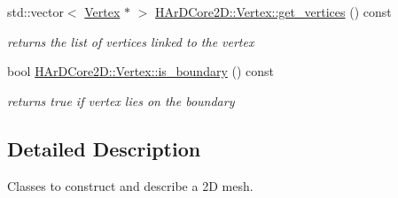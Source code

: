 \begin{DoxyCompactItemize}
\mbox{\label{group__Mesh_ga67a622b04ce68250a53bc0825487bb6e}} 
std\+::vector$<$ \hyperlink{classHArDCore2D_1_1Vertex}{Vertex} $\ast$ $>$ \hyperlink{group__Mesh_ga67a622b04ce68250a53bc0825487bb6e}{H\+Ar\+D\+Core2\+D\+::\+Vertex\+::get\+\_\+vertices} () const
\begin{DoxyCompactList}\small\item\em returns the list of vertices linked to the vertex \end{DoxyCompactList}\item 
\mbox{\label{group__Mesh_gaea5f04b0b268e3de29d3de7d9034b4fc}} 
bool \hyperlink{group__Mesh_gaea5f04b0b268e3de29d3de7d9034b4fc}{H\+Ar\+D\+Core2\+D\+::\+Vertex\+::is\+\_\+boundary} () const
\begin{DoxyCompactList}\small\item\em returns true if vertex lies on the boundary \end{DoxyCompactList}\end{DoxyCompactItemize}


\subsection{Detailed Description}
Classes to construct and describe a 2D mesh. 

